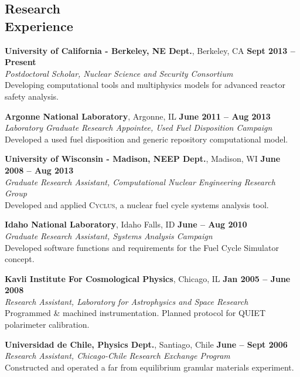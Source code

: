\documentclass[margin,line]{resume}
\newcommand{\Cyclus}{\textsc{Cyclus}\xspace}
\begin{document}
\begin{resume}
    \section{\mysidestyle Research\\Experience}
    \textbf{University of California - Berkeley, NE Dept.}, Berkeley, CA \hfill \textbf{Sept 2013 -- Present}\\
		\textsl{Postdoctoral Scholar, Nuclear Science and Security Consortium}\\ 
                Developing computational tools and multiphysics models for advanced reactor safety analysis.  \vspace{-3mm}

    \textbf{Argonne National Laboratory}, Argonne, IL \hfill \textbf{June 2011 -- Aug 2013}\\
		\textsl{Laboratory Graduate Research Appointee, Used Fuel Disposition Campaign}\\ 
		Developed a used fuel disposition and generic repository computational model.  \vspace{-3mm}

    \textbf{University of Wisconsin - Madison, NEEP Dept.}, Madison, WI \hfill \textbf{June 2008 -- Aug 2013}\\
		\textsl{Graduate Research Assistant, Computational Nuclear Engineering Research Group}\\ 
		Developed and applied \Cyclus, a nuclear fuel cycle systems analysis tool.  \vspace{-3mm}

    \textbf{Idaho National Laboratory}, Idaho Falls, ID \hfill \textbf{June -- Aug 2010}\\
		\textsl{Graduate Research Assistant, Systems Analysis Campaign}\\ 
		Developed software functions and requirements for the Fuel Cycle Simulator concept.  \vspace{-3mm}

    \textbf{Kavli Institute For Cosmological Physics}, Chicago, IL \hfill \textbf{Jan 2005 -- June 2008}\\
                \textsl{Research Assistant, Laboratory for Astrophysics and Space Research}\\
                Programmed \& machined instrumentation. Planned protocol for QUIET polarimeter calibration.  \vspace{-3mm}

    \textbf{Universidad de Chile, Physics Dept.}, Santiago, Chile \hfill \textbf{June -- Sept 2006}\\
                \textsl{Research Assistant, Chicago-Chile Research Exchange Program}\\
                 Constructed and operated a far from equilibrium granular materials experiment.  \vspace{-3mm}


\end{resume}
\end{document}

